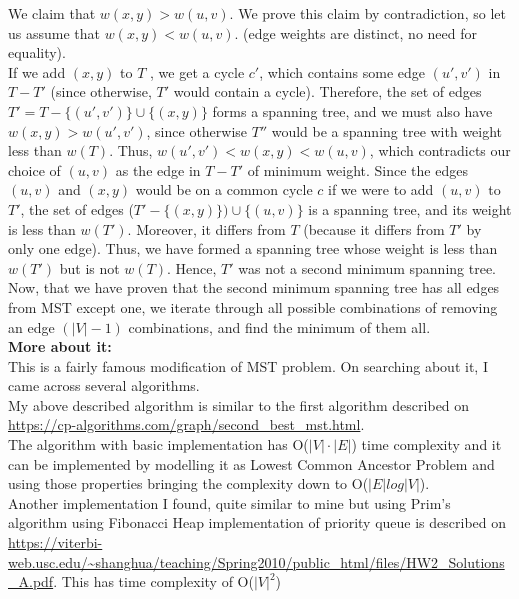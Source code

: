 \documentclass[11pt, fleqn]{article}
\begin{document}
We claim that $w(x, y) > w(u, v)$. We prove this claim by contradiction, so let us assume that $w(x, y) < w(u, v)$. (edge weights are distinct, no need for equality). \\
If we add $(x, y)$ to $T$ , we get a cycle $c'$, which contains some edge $(u', v')$ in $T-T'$ (since otherwise, $T'$ would contain a cycle). Therefore, the set of edges $T' = T - \{(u', v')\} \cup \{(x,y)\}$ forms a spanning tree, and we must also have $w(x, y) > w(u', v')$, since otherwise $T''$ would be a spanning tree with weight less than $w(T)$. Thus, $w(u', v') < w(x,y) < w(u,v)$, which contradicts our choice of $(u,v)$ as the edge in $T - T'$ of minimum weight.
Since the edges $(u, v)$ and $(x,y)$ would be on a common cycle $c$ if we were to add $(u, v)$ to $T'$, the set of edges ($T' - \{(x, y)\}) \cup \{(u, v)\}$ is a spanning tree, and its weight is less than $w(T')$. Moreover, it differs from $T$ (because it differs from $T'$ by only one edge). Thus, we have formed a spanning tree whose weight is less than $w(T')$ but is not $w(T)$. Hence, $T'$ was not a second minimum spanning tree. \\

Now, that we have proven that the second minimum spanning tree has all edges from MST except one, we iterate through all possible combinations of removing an edge $(|V|-1)$ combinations, and find the minimum of them all. \\

\textbf{More about it:}\\
This is a fairly famous modification of MST problem. On searching about it, I came across several algorithms.\\
My above described algorithm is similar to the first algorithm described on \url{https://cp-algorithms.com/graph/second_best_mst.html}.\\
The algorithm with basic implementation has O($|V|\cdot|E|$) time complexity and it can be implemented by modelling it as Lowest Common Ancestor Problem and using those properties bringing the complexity down to O($|E|log|V|$).\\
Another implementation I found, quite similar to mine but using Prim's algorithm using Fibonacci Heap implementation of priority queue is described on \url{https://viterbi-web.usc.edu/~shanghua/teaching/Spring2010/public_html/files/HW2_Solutions_A.pdf}. This has time complexity of O($|V|^2$)
\end{document}

